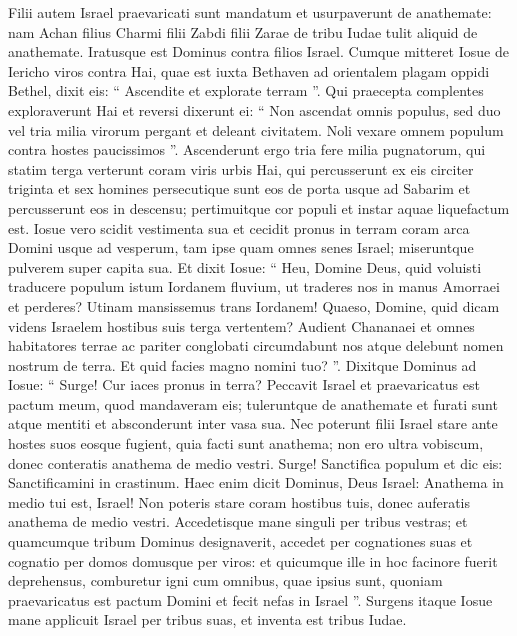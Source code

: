 \begin{biblechapter}
\begin{biblechapter}
\begin{biblechapter}
\begin{biblechapter}
\begin{biblechapter}
\begin{biblechapter}
\begin{biblechapter}
\verse Filii autem Israel praevaricati sunt mandatum et usurpaverunt de anathemate: nam Achan filius Charmi filii Zabdi filii Zarae de tribu Iudae tulit aliquid de anathemate. Iratusque est Dominus contra filios Israel.
 \verse Cumque mitteret Iosue de Iericho viros contra Hai, quae est iuxta Bethaven ad orientalem plagam oppidi Bethel, dixit eis: “ Ascendite et explorate terram ”. Qui praecepta complentes exploraverunt Hai 
\verse et reversi dixerunt ei: “ Non ascendat omnis populus, sed duo vel tria milia virorum pergant et deleant civitatem. Noli vexare omnem populum contra hostes paucissimos ”. 
\verse Ascenderunt ergo tria fere milia pugnatorum, qui statim terga verterunt coram viris urbis Hai, 
\verse qui percusserunt ex eis circiter triginta et sex homines persecutique sunt eos de porta usque ad Sabarim et percusserunt eos in descensu; pertimuitque cor populi et instar aquae liquefactum est.
 \verse Iosue vero scidit vestimenta sua et cecidit pronus in terram coram arca Domini usque ad vesperum, tam ipse quam omnes senes Israel; miseruntque pulverem super capita sua. 
\verse Et dixit Iosue: “ Heu, Domine Deus, quid voluisti traducere populum istum Iordanem fluvium, ut traderes nos in manus Amorraei et perderes? Utinam mansissemus trans Iordanem! 
\verse Quaeso, Domine, quid dicam videns Israelem hostibus suis terga vertentem? 
\verse Audient Chananaei et omnes habitatores terrae ac pariter conglobati circumdabunt nos atque delebunt nomen nostrum de terra. Et quid facies magno nomini tuo? ”.
 \verse Dixitque Dominus ad Iosue: “ Surge! Cur iaces pronus in terra? 
\verse Peccavit Israel et praevaricatus est pactum meum, quod mandaveram eis; tuleruntque de anathemate et furati sunt atque mentiti et absconderunt inter vasa sua. 
\verse Nec poterunt filii Israel stare ante hostes suos eosque fugient, quia facti sunt anathema; non ero ultra vobiscum, donec conteratis anathema de medio vestri. 
\verse Surge! Sanctifica populum et dic eis: Sanctificamini in crastinum. Haec enim dicit Dominus, Deus Israel: Anathema in medio tui est, Israel! Non poteris stare coram hostibus tuis, donec auferatis anathema de medio vestri. 
\verse Accedetisque mane singuli per tribus vestras; et quamcumque tribum Dominus designaverit, accedet per cognationes suas et cognatio per domos domusque per viros: 
\verse et quicumque ille in hoc facinore fuerit deprehensus, comburetur igni cum omnibus, quae ipsius sunt, quoniam praevaricatus est pactum Domini et fecit nefas in Israel ”.
 \verse Surgens itaque Iosue mane applicuit Israel per tribus suas, et inventa est tribus Iudae. 

\end{biblechapter}
\end{biblechapter}
\end{biblechapter}
\end{biblechapter}
\end{biblechapter}
\end{biblechapter}
\end{biblechapter}
